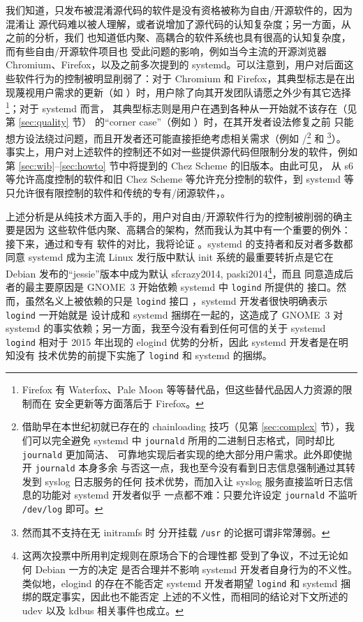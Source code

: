 我们知道，只发布被混淆源代码的软件是没有资格被称为自由/开源软件的，因为混淆让
源代码难以被人理解，或者说增加了源代码的认知复杂度；另一方面，从之前的分析，我们
也知道低内聚、高耦合的软件系统也具有很高的认知复杂度，而有些自由/开源软件项目也
受此问题的影响，例如当今主流的开源浏览器 Chromium、Firefox，以及之前多次提到的
systemd。可以注意到，用户对后面这些软件行为的控制被明显削弱了：对于 Chromium
和 Firefox，其典型标志是在出现蔑视用户需求的更新（如 \parencite{beauhd2019,
namelessvoice2018}）时，用户除了向其开发团队请愿之外少有其它选择\footnote{%
Firefox 有 Waterfox、Pale Moon 等等替代品，但这些替代品因人力资源的限制而在
安全更新等方面落后于 Firefox。}；对于 systemd 而言，
其典型标志则是用户在遇到各种从一开始就不该存在（见第 \ref{sec:quality} 节）
的“corner case”（例如 \parencite{ratagupt2017}）时，在其开发者设法修复之前
只能想方设法绕过问题，而且开发者还可能直接拒绝考虑相关需求（例如 \parencite%
{akcaagac2013}/\parencite{junta2017}\footnote{借助早在本世纪初就已存在的
chainloading 技巧（见第 \ref{sec:complex} 节），我们可以完全避免 systemd 中
\texttt{journald} 所用的二进制日志格式，同时却比 \texttt{journald} 更加简洁、
可靠地实现后者实现的绝大部分用户需求。此外即使抛开 \texttt{journald} 本身多余
与否这一点，我也至今没有看到日志信息强制通过其转发到 syslog 日志服务的任何
技术优势，而加入让 syslog 服务直接监听日志信息的功能对 systemd 开发者似乎
一点都不难：只要允许设定 \texttt{journald} 不监听 \texttt{/dev/log} 即可。}
和 \parencite{freedesktop:sepusr}\footnote{然而其不支持在无 initramfs 时
分开挂载 \texttt{/usr} 的论据可谓非常薄弱。}）。
事实上，用户对上述软件的控制还不如对一些提供源代码但限制分发的软件，例如第
\ref{sec:wib}--\ref{sec:howto} 节中将提到的 Chez Scheme 的旧版本。由此可见，
从 s6 等允许高度控制的软件和旧 Chez Scheme 等允许充分控制的软件，到 systemd
等只允许很有限控制的软件和传统的专有/闭源软件，。

上述分析是从纯技术方面入手的，用户对自由/开源软件行为的控制被削弱的确主要是因为
这些软件低内聚、高耦合的架构，然而我认为其中有一个重要的例外：接下来，通过和专有
软件的对比，我将论证 。systemd 的支持者和反对者多数都同意 systemd 成为主流 Linux 发行版中默认
init 系统的最重要转折点是它在 Debian 发布的“jessie”版本中成为默认\cupercite%
{sfcrazy2014, paski2014}\footnote{这两次投票中所用判定规则在原场合下的合理性都
受到了争议，不过无论如何 Debian 一方的决定
是否合理并不影响 systemd 开发者自身行为的不义性。类似地，elogind 的存在不能否定
systemd 开发者期望 \texttt{logind} 和 systemd 捆绑的既定事实，因此也不能否定
上述的不义性，而相同的结论对下文所述的 udev 以及 kdbus 相关事件也成立。}，而且
同意造成后者的最主要原因是 GNOME~3 开始依赖 systemd 中 \verb|logind| 所提供的
接口。然而，虽然名义上被依赖的只是 \verb|logind| 接口%
，systemd 开发者很快明确表示 \verb|logind| 一开始就是
设计成和 systemd 捆绑在一起的，这造成了 GNOME~3 对
systemd 的事实依赖；另一方面，我至今没有看到任何可信的关于 systemd \verb|logind|
相对于 2015 年出现的 elogind 优势的分析，因此 systemd 开发者是在明知没有
技术优势的前提下实施了 \verb|logind| 和 systemd 的捆绑。

